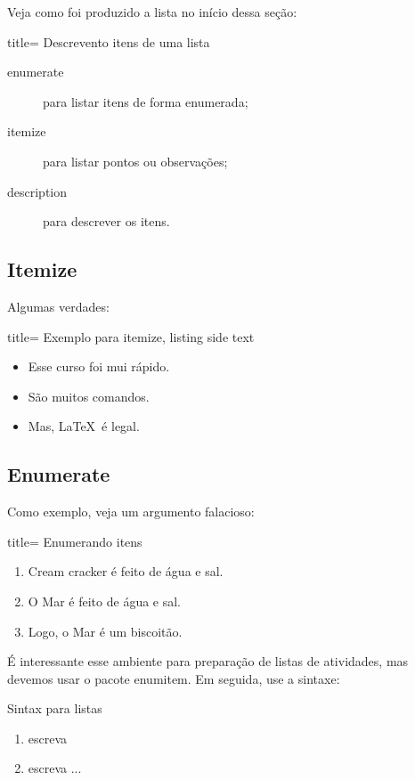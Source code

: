 Veja como foi produzido a lista no início dessa seção:

\begin{tcblisting}{title= Descrevento itens de uma lista}
\begin{description}
\item[enumerate] para listar itens de forma enumerada;
\item[itemize]para listar pontos ou observações;
\item[description]para descrever os itens.
\end{description}
\end{tcblisting}

%
  \subsection{Itemize}
%

Algumas verdades:

\begin{tcblisting}{title= Exemplo para itemize, listing side text}
\begin{itemize}
\item Esse curso foi mui rápido.
\item São muitos comandos.
\item Mas, \LaTeX\ é legal.
\end{itemize}
\end{tcblisting}

%
  \subsection{Enumerate}
%

Como exemplo, veja um argumento falacioso:

\begin{tcblisting}{title= Enumerando itens}
\begin{enumerate}
  \item Cream cracker é feito de água e sal.
  \item O Mar é feito de água e sal.
  \item Logo, o Mar é um biscoitão.
\end{enumerate}
\end{tcblisting}

É interessante esse ambiente para preparação de listas de atividades, mas devemos 
usar o pacote \textsf{enumitem}.
Em seguida, use a sintaxe:

\begin{codigo}{Sintax para listas}{\lapis}
\begin{enumerate}[opções]
  \item escreva
  \item escreva
  ...
\end{enumerate}
\end{codigo}

